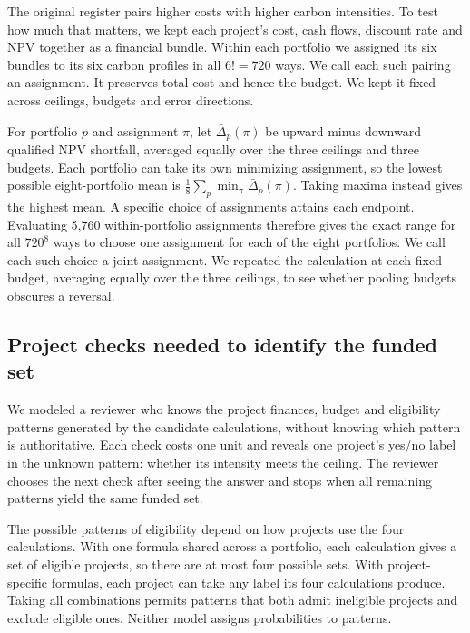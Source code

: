 The original register pairs higher costs with higher carbon intensities. To test how much that matters, we kept each project's cost, cash flows, discount rate and NPV together as a financial bundle. Within each portfolio we assigned its six bundles to its six carbon profiles in all $6!=720$ ways. We call each such pairing an assignment. It preserves total cost and hence the budget. We kept it fixed across ceilings, budgets and error directions.

For portfolio $p$ and assignment $\pi$, let $\bar\Delta_p(\pi)$ be upward minus downward qualified NPV shortfall, averaged equally over the three ceilings and three budgets. Each portfolio can take its own minimizing assignment, so the lowest possible eight-portfolio mean is $\tfrac18\sum_p\min_\pi\bar\Delta_p(\pi)$. Taking maxima instead gives the highest mean. A specific choice of assignments attains each endpoint. Evaluating 5,760 within-portfolio assignments therefore gives the exact range for all $720^8$ ways to choose one assignment for each of the eight portfolios. We call each such choice a joint assignment. We repeated the calculation at each fixed budget, averaging equally over the three ceilings, to see whether pooling budgets obscures a reversal.

\subsection{Project checks needed to identify the funded set}
We modeled a reviewer who knows the project finances, budget and eligibility patterns generated by the candidate calculations, without knowing which pattern is authoritative. Each check costs one unit and reveals one project's yes/no label in the unknown pattern: whether its intensity meets the ceiling. The reviewer chooses the next check after seeing the answer and stops when all remaining patterns yield the same funded set.

The possible patterns of eligibility depend on how projects use the four calculations. With one formula shared across a portfolio, each calculation gives a set of eligible projects, so there are at most four possible sets. With project-specific formulas, each project can take any label its four calculations produce. Taking all combinations permits patterns that both admit ineligible projects and exclude eligible ones. Neither model assigns probabilities to patterns.

